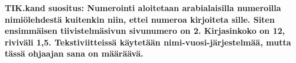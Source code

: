 



\textbf{TIK.kand suositus: Numerointi aloitetaan arabialaisilla
  numeroilla nimiölehdestä kuitenkin niin, ettei numeroa kirjoiteta
  sille. Siten ensimmäisen tiivistelmäsivun sivunumero on 2. 
  Kirjasinkoko on 12, riviväli 1,5. Tekstiviitteissä käytetään
  nimi-vuosi-järjestelmää, mutta tässä ohjaajan sana on määräävä.}




